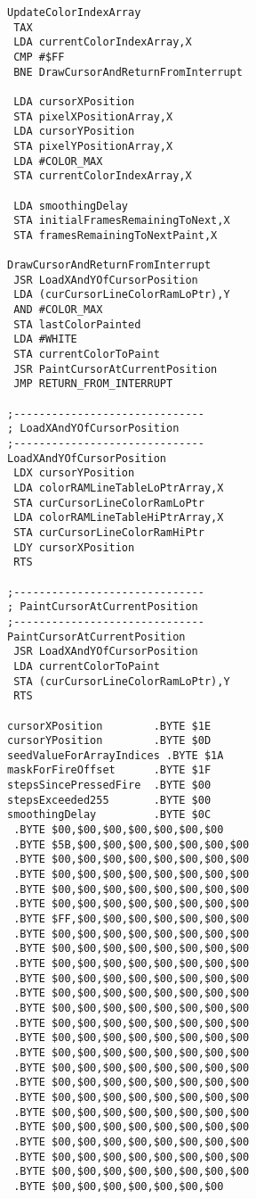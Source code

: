 \begin{minipage}[b]{0.33\linewidth}
\begin{lrbox}{\mybox}%
\begin{lstlisting}[basicstyle=\ttfamily\tiny]
UpdateColorIndexArray  
 TAX 
 LDA currentColorIndexArray,X
 CMP #$FF
 BNE DrawCursorAndReturnFromInterrupt

 LDA cursorXPosition
 STA pixelXPositionArray,X
 LDA cursorYPosition
 STA pixelYPositionArray,X
 LDA #COLOR_MAX
 STA currentColorIndexArray,X

 LDA smoothingDelay
 STA initialFramesRemainingToNext,X
 STA framesRemainingToNextPaint,X

DrawCursorAndReturnFromInterrupt   
 JSR LoadXAndYOfCursorPosition
 LDA (curCursorLineColorRamLoPtr),Y
 AND #COLOR_MAX
 STA lastColorPainted
 LDA #WHITE
 STA currentColorToPaint
 JSR PaintCursorAtCurrentPosition
 JMP RETURN_FROM_INTERRUPT

;------------------------------
; LoadXAndYOfCursorPosition
;------------------------------
LoadXAndYOfCursorPosition   
 LDX cursorYPosition
 LDA colorRAMLineTableLoPtrArray,X
 STA curCursorLineColorRamLoPtr
 LDA colorRAMLineTableHiPtrArray,X
 STA curCursorLineColorRamHiPtr
 LDY cursorXPosition
 RTS 

;------------------------------
; PaintCursorAtCurrentPosition
;------------------------------
PaintCursorAtCurrentPosition   
 JSR LoadXAndYOfCursorPosition
 LDA currentColorToPaint
 STA (curCursorLineColorRamLoPtr),Y
 RTS 

cursorXPosition        .BYTE $1E
cursorYPosition        .BYTE $0D
seedValueForArrayIndices .BYTE $1A
maskForFireOffset      .BYTE $1F
stepsSincePressedFire  .BYTE $00
stepsExceeded255       .BYTE $00
smoothingDelay         .BYTE $0C
 .BYTE $00,$00,$00,$00,$00,$00,$00
 .BYTE $5B,$00,$00,$00,$00,$00,$00,$00
 .BYTE $00,$00,$00,$00,$00,$00,$00,$00
 .BYTE $00,$00,$00,$00,$00,$00,$00,$00
 .BYTE $00,$00,$00,$00,$00,$00,$00,$00
 .BYTE $00,$00,$00,$00,$00,$00,$00,$00
 .BYTE $FF,$00,$00,$00,$00,$00,$00,$00
 .BYTE $00,$00,$00,$00,$00,$00,$00,$00
 .BYTE $00,$00,$00,$00,$00,$00,$00,$00
 .BYTE $00,$00,$00,$00,$00,$00,$00,$00
 .BYTE $00,$00,$00,$00,$00,$00,$00,$00
 .BYTE $00,$00,$00,$00,$00,$00,$00,$00
 .BYTE $00,$00,$00,$00,$00,$00,$00,$00
 .BYTE $00,$00,$00,$00,$00,$00,$00,$00
 .BYTE $00,$00,$00,$00,$00,$00,$00,$00
 .BYTE $00,$00,$00,$00,$00,$00,$00,$00
 .BYTE $00,$00,$00,$00,$00,$00,$00,$00
 .BYTE $00,$00,$00,$00,$00,$00,$00,$00
 .BYTE $00,$00,$00,$00,$00,$00,$00,$00
 .BYTE $00,$00,$00,$00,$00,$00,$00,$00
 .BYTE $00,$00,$00,$00,$00,$00,$00,$00
 .BYTE $00,$00,$00,$00,$00,$00,$00,$00
 .BYTE $00,$00,$00,$00,$00,$00,$00,$00
 .BYTE $00,$00,$00,$00,$00,$00,$00,$00
 .BYTE $00,$00,$00,$00,$00,$00,$00


\end{lstlisting}
\end{lrbox}
\end{minipage}
